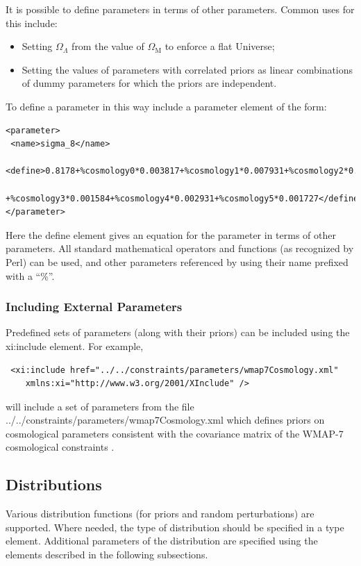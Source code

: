 It is possible to define parameters in terms of other parameters. Common uses for this include:
\begin{itemize}
 \item Setting $\Omega_\Lambda$ from the value of $\Omega_\mathrm{M}$ to enforce a flat Universe;
 \item Setting the values of parameters with correlated priors as linear combinations of dummy parameters for which the priors are independent.
\end{itemize}
To define a parameter in this way include a {\normalfont \ttfamily parameter} element of the form:
\begin{verbatim}
<parameter>
 <name>sigma_8</name>
 <define>0.8178+%cosmology0*0.003817+%cosmology1*0.007931+%cosmology2*0.01002
    +%cosmology3*0.001584+%cosmology4*0.002931+%cosmology5*0.001727</define>
</parameter>
\end{verbatim}
Here the {\normalfont \ttfamily define} element gives an equation for the parameter in terms of other parameters. All standard mathematical operators and functions (as recognized by Perl) can be used, and other parameters referenced by using their name prefixed with a ``\%''.

\subsubsection{Including External Parameters}

Predefined sets of parameters (along with their priors) can be included using the {\normalfont \ttfamily xi:include} element. For example,
\begin{verbatim}
 <xi:include href="../../constraints/parameters/wmap7Cosmology.xml"
    xmlns:xi="http://www.w3.org/2001/XInclude" />
\end{verbatim}
will include a set of parameters from the file {\normalfont \ttfamily ../../constraints/parameters/wmap7Cosmology.xml} which defines priors on cosmological parameters consistent with the covariance matrix of the WMAP-7 cosmological constraints \citep{komatsu_seven-year_2010}.

\subsection{Distributions}

Various distribution functions (for priors and random perturbations) are supported. Where needed, the type of distribution should be specified in a {\normalfont \ttfamily type} element. Additional parameters of the distribution are specified using the elements described in the following subsections.

